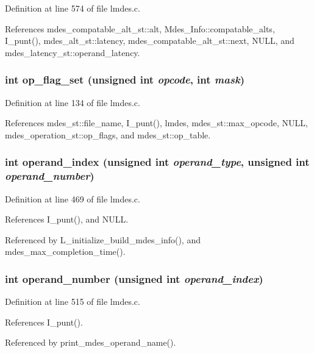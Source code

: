 Definition at line 574 of file lmdes.c.

References mdes\_\-compatable\_\-alt\_\-st::alt, Mdes\_\-Info::compatable\_\-alts, I\_\-punt(), mdes\_\-alt\_\-st::latency, mdes\_\-compatable\_\-alt\_\-st::next, NULL, and mdes\_\-latency\_\-st::operand\_\-latency.
\subsubsection{\setlength{\rightskip}{0pt plus 5cm}int op\_\-flag\_\-set (unsigned int {\em opcode}, int {\em mask})}\label{lmdes_8h_67805a2222096472207405f876bd1303}




Definition at line 134 of file lmdes.c.

References mdes\_\-st::file\_\-name, I\_\-punt(), lmdes, mdes\_\-st::max\_\-opcode, NULL, mdes\_\-operation\_\-st::op\_\-flags, and mdes\_\-st::op\_\-table.
\subsubsection{\setlength{\rightskip}{0pt plus 5cm}int operand\_\-index (unsigned int {\em operand\_\-type}, unsigned int {\em operand\_\-number})}\label{lmdes_8h_e84d5f3f40b5dc3a74d29e1f3762c671}




Definition at line 469 of file lmdes.c.

References I\_\-punt(), and NULL.

Referenced by L\_\-initialize\_\-build\_\-mdes\_\-info(), and mdes\_\-max\_\-completion\_\-time().
\subsubsection{\setlength{\rightskip}{0pt plus 5cm}int operand\_\-number (unsigned int {\em operand\_\-index})}\label{lmdes_8h_ff92d6b9d3171335fbe5b748e0b54a74}




Definition at line 515 of file lmdes.c.

References I\_\-punt().

Referenced by print\_\-mdes\_\-operand\_\-name().
